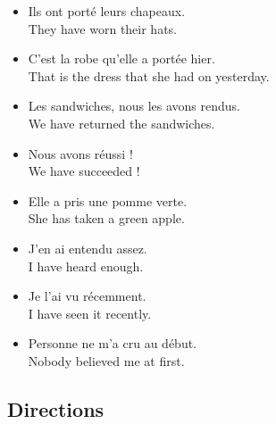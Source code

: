 \begin{itemize}
	\item  Ils ont port{\'e} leurs chapeaux. \\ They have worn their hats.
	\item  C'est la robe qu'elle a port{\'e}e hier. \\ That is the dress that she had on yesterday.
	\item  Les sandwiches, nous les avons rendus. \\ We have returned the sandwiches.
	\item  Nous avons r{\'e}ussi ! \\ We have succeeded !
	\item  Elle a pris une pomme verte. \\ She has taken a green apple.
	\item  J'en ai entendu assez. \\ I have heard enough.
	\item  Je l'ai vu r{\'e}cemment. \\ I have seen it recently.
	\item  Personne ne m'a cru au d{\'e}but. \\ Nobody believed me at first.
\end{itemize}


\pagebreak
\subsection{Directions}

